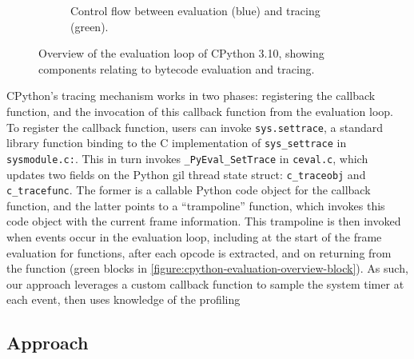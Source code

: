 \begin{figure}[H]
\begin{subfigure}[b]{0.3\textwidth}
       \vspace{1em}
       \caption{Control flow between evaluation (blue) and tracing (green).}
       \label{figure:cpython-evaluation-overview-block}
    \end{subfigure}
    \vspace{2em}
    \captionsetup{name=Listing}
    \caption{Overview of the evaluation loop of CPython 3.10, showing components relating to bytecode evaluation and tracing.}
    \label{figure:cpython-evaluation-overview}
\end{figure}


CPython's tracing mechanism works in two phases: registering the callback function, and the invocation of this callback function from the evaluation loop.
To register the callback function, users can invoke \texttt{sys.settrace}, a standard library function binding to the C implementation of \texttt{sys\_settrace} in \texttt{sysmodule.c:}. This in turn invokes \texttt{\_PyEval\_SetTrace} in \texttt{ceval.c}, which updates two fields on the Python \ac{gil} thread state struct: \texttt{c\_traceobj} and \texttt{c\_tracefunc}. The former is a callable Python code object for the callback function, and the latter points to a ``trampoline'' function, which invokes this code object with the current frame information.
This trampoline is then invoked when events occur in the evaluation loop, including at the start of the frame evaluation for functions, after each opcode is extracted, and on returning from the function (green blocks in \autoref{figure:cpython-evaluation-overview-block}).
As such, our approach leverages a custom callback function to sample the system timer at each event, then uses knowledge of the profiling


\subsection{Approach}
\label{ssec:profiling-bytecode-approach}




